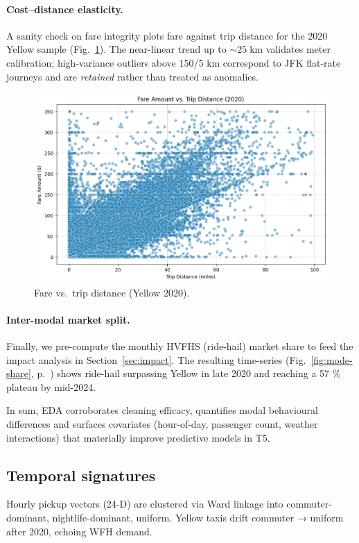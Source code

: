 \documentclass[conference]{IEEEtran}
\begin{document}
  \paragraph*{Cost–distance elasticity.}
  A sanity check on fare integrity plots fare against trip distance for the 2020
  Yellow sample (Fig.~\ref{fig:fare-vs-dist}).  The near-linear trend up to
  \(\sim\!25\;\mathrm{km}\) validates meter calibration; high-variance outliers
  above 150/5 km correspond to JFK flat-rate journeys and are \emph{retained}
  rather than treated as anomalies.

  \begin{figure}[htbp]
    \centering
    \includegraphics[width=0.9\linewidth]{figures/fare_vs_distance.png}
    \caption{Fare vs.\ trip distance (Yellow 2020).}
    \label{fig:fare-vs-dist}
  \end{figure}

  \paragraph*{Inter-modal market split.}
  Finally, we pre-compute the monthly HVFHS (ride-hail) market share to feed the
  impact analysis in Section~\ref{sec:impact}.  The resulting time-series
  (Fig.~\ref{fig:mode-share}, p.~\pageref{fig:mode-share}) shows ride-hail
  surpassing Yellow in late 2020 and reaching a 57 \% plateau by mid-2024.

  \vspace{0.5em}
  In sum, EDA corroborates cleaning efficacy, quantifies modal behavioural
  differences and surfaces covariates (hour-of-day, passenger count, weather
  interactions) that materially improve predictive models in T5.

  \subsection{Temporal signatures}
  Hourly pickup vectors (24-D) are clustered via Ward linkage into
  commuter-dominant, nightlife-dominant, uniform.
  Yellow taxis drift commuter → uniform after 2020, echoing WFH demand.
\end{document}
